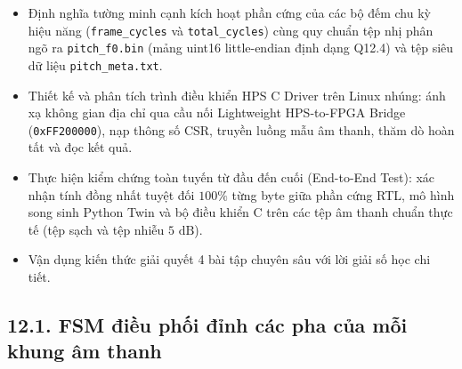 \begin{learningobj}
\begin{itemize}
    \item Định nghĩa tường minh cạnh kích hoạt phần cứng của các bộ đếm chu kỳ hiệu năng (\texttt{frame\_cycles} và \texttt{total\_cycles}) cùng quy chuẩn tệp nhị phân ngõ ra \texttt{pitch\_f0.bin} (mảng uint16 little-endian định dạng Q12.4) và tệp siêu dữ liệu \texttt{pitch\_meta.txt}.
    \item Thiết kế và phân tích trình điều khiển HPS C Driver trên Linux nhúng: ánh xạ không gian địa chỉ qua cầu nối Lightweight HPS-to-FPGA Bridge (\texttt{0xFF200000}), nạp thông số CSR, truyền luồng mẫu âm thanh, thăm dò hoàn tất và đọc kết quả.
    \item Thực hiện kiểm chứng toàn tuyến từ đầu đến cuối (End-to-End Test): xác nhận tính đồng nhất tuyệt đối $100\%$ từng byte giữa phần cứng RTL, mô hình song sinh Python Twin và bộ điều khiển C trên các tệp âm thanh chuẩn thực tế (tệp sạch và tệp nhiễu $5\text{ dB}$).
    \item Vận dụng kiến thức giải quyết 4 bài tập chuyên sâu với lời giải số học chi tiết.
\end{itemize}
\end{learningobj}

\subsection*{12.1. FSM điều phối đỉnh các pha của mỗi khung âm thanh}

